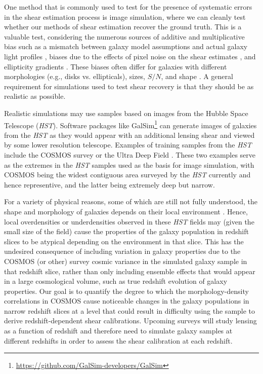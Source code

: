 \documentclass[twocolumn,useAMS,usenatbib]{mn2e}
\begin{document}
One method that is commonly used to test for the presence of
systematic errors in the shear estimation process is image simulation,
where we can cleanly test whether our methods of shear estimation
recover the ground truth. This is a valuable test, considering the
numerous sources of additive and multiplicative bias such as a
mismatch between galaxy model assumptions and actual galaxy light
profiles \citep[e.g.,][]{2010MNRAS.404..458V, 2010A&A...510A..75M}, biases due to the effects of pixel noise on the
shear estimates
\citep{2012MNRAS.427.2711K,2012MNRAS.424.2757M,2012MNRAS.425.1951R},
and ellipticity gradients \citep{2010MNRAS.406.2793B}.  These biases
often differ for galaxies with different morphologies (e.g., disks
vs. ellipticals), sizes, $S/N$, and shape \citep{2010MNRAS.405.2044B,2012MNRAS.423.3163K}. 
A general requirement for simulations used to test shear recovery is
that they should be as realistic as possible.
 
 Realistic simulations may use samples based on images from the Hubble
 Space Telescope ({\em HST}).
Software packages like
{\sc GalSim}\footnote{\url{https://github.com/GalSim-developers/GalSim}}
\citep{2014arXiv1407.7676R} can generate images of galaxies from the
{\em HST} as they would appear with an additional lensing shear and
viewed by some lower resolution telescope.  Examples of training samples from the {\em HST} include 
the COSMOS survey \citep[used by the GREAT3 challenge,][]{great3} or the
 Ultra Deep Field \citep[UDF, used by][]{2013ApJ...765...74J}.  These
 two examples serve as the extremes in the {\em HST} samples used as
 the basis for image simulation, with COSMOS being 
the widest contiguous area surveyed by the {\em HST} currently and hence representive, and the 
latter being extremely deep but narrow.

For a variety of physical reasons, some of which are still not fully
understood, the shape and morphology of
galaxies depends on their local environment
\citep[e.g.,][]{2014arXiv1402.1172C,2014MNRAS.444.2200D}. 
Hence, local overdensities or underdensities
observed in these {\em HST} fields may (given the small size of the field)
cause the properties of the galaxy population in redshift slices to be
atypical depending on the environment in that slice.  This has
the undesired consequence of including variation in galaxy properties
due to the COSMOS (or other) survey cosmic variance in the simulated galaxy sample in that redshift slice, rather than
only including ensemble effects that would appear in a large cosmological volume, such as true redshift evolution of
galaxy properties.  Our goal is to quantify the degree to which the
morphology-density correlations in COSMOS cause noticeable changes in
the galaxy populations in narrow redshift slices at a level that could
result in difficulty using the sample to derive redshift-dependent
shear calibrations.   Upcoming surveys will study lensing as a function of
redshift and therefore need to simulate galaxy samples at different
redshifts in order to assess the shear calibration at each redshift.
\end{document}
